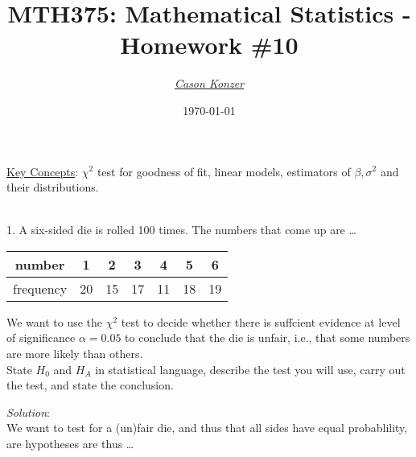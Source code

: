 \documentclass[12pt]{article}
\newcommand{\XB}{\color{black}}
\newcommand{\XBB}{\color{blue}}
\newcommand{\XV}{\color{violet}}
\begin{document}
\title{\textbf{MTH375}: Mathematical Statistics - Homework \#10}
\date{\today}
\author{\XV\textit{\large{\href{https://github.com/casonk}{Cason Konzer}}}\XB}

\maketitle
\hrulefill
\vfill 
    \underline{Key Concepts}: $ \chi^{2} $ test for goodness of fit, linear models, estimators of 
    $ \beta, \sigma^{2} $ and their distributions.

\newpage
\newpage
\XBB\hrulefill\XB \\

1. A six-sided die is rolled 100 times. The numbers that come up are \dots \\ 

\begin{center}
    \begin{tabular}{ c||c|c|c|c|c|c } 
     number    & 1  & 2  & 3  & 4  & 5  & 6  \\ 
     \hline
     frequency & 20 & 15 & 17 & 11 & 18 & 19 \\ 
    \end{tabular}
\end{center}

We want to use the $ \chi^{2} $ test to decide whether there is suffcient evidence at level of significance $ \alpha = 0.05 $ 
to conclude that the die is unfair, i.e., that some numbers are more likely than others. \\

State $ H_{0} $ and $ H_{A} $ in statistical language, describe the test you will use, carry out the test,
and state the conclusion. \\

\XBB\hrulefill\XB 
\vspace{5mm}

\vspace{2.5mm} 
\textit{Solution}:
\vspace{2.5mm} \\

\noindent
We want to test for a (un)fair die, and thus that all sides have equal probablility, are hypotheses are thus \dots \\
\end{document}
